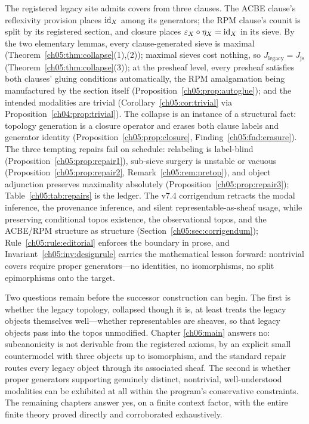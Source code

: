 The registered legacy site admits covers from three clauses. The ACBE
clause's reflexivity provision places $\mathrm{id}_X$ among its generators; the RPM
clause's counit is split by its registered section, and closure places
$\varepsilon_X\circ\eta_X=\mathrm{id}_X$ in its sieve. By the two elementary lemmas,
every clause-generated sieve is maximal
(Theorem~\ref{ch05:thm:collapse}(1),(2)); maximal sieves cost nothing, so
$J_{\mathrm{legacy}}=J_{\mathrm{js}}$
(Theorem~\ref{ch05:thm:collapse}(3)); at the presheaf level, every presheaf
satisfies both clauses' gluing conditions automatically, the RPM
amalgamation being manufactured by the section itself
(Proposition~\ref{ch05:prop:autoglue}); and the intended modalities are
trivial (Corollary~\ref{ch05:cor:trivial} via
Proposition~\ref{ch04:prop:trivial}). The collapse is an instance of a
structural fact: topology generation is a closure operator and erases both
clause labels and generator identity (Proposition~\ref{ch05:prop:closure},
Finding~\ref{ch05:fnd:erasure}). The three tempting repairs fail on
schedule: relabeling is label-blind
(Proposition~\ref{ch05:prop:repair1}), sub-sieve surgery is unstable or
vacuous (Proposition~\ref{ch05:prop:repair2},
Remark~\ref{ch05:rem:pretop}), and object adjunction preserves maximality
absolutely (Proposition~\ref{ch05:prop:repair3});
Table~\ref{ch05:tab:repairs} is the ledger. The v7.4 corrigendum retracts
the modal inference, the provenance inference, and silent
representable-as-sheaf usage, while preserving conditional topos existence,
the observational topos, and the ACBE/RPM structure as structure
(Section~\ref{ch05:sec:corrigendum}); Rule~\ref{ch05:rule:editorial}
enforces the boundary in prose, and
Invariant~\ref{ch05:inv:designrule} carries the mathematical lesson
forward: nontrivial covers require proper generators---no identities, no
isomorphisms, no split epimorphisms onto the target.

Two questions remain before the successor construction can begin. The first
is whether the legacy topology, collapsed though it is, at least treats the
legacy objects themselves well---whether representables are sheaves, so
that legacy objects pass into the topos unmodified. Chapter
\ref{ch06:main} answers no: subcanonicity is not derivable from the
registered axioms, by an explicit small countermodel with three objects up
to isomorphism, and the standard
repair routes every legacy object through its associated sheaf. The second
is whether proper generators supporting genuinely distinct, nontrivial,
well-understood modalities can be exhibited at all within the program's
conservative constraints. The remaining chapters answer yes, on a finite
context factor, with the entire finite theory proved directly and
corroborated exhaustively.


